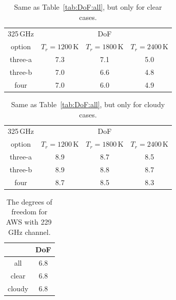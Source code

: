 \documentclass[12pt]{article}
\begin{document}
\begin{table}[!p]
	\centering
	\begin{tabular}[b]{c|c|c|c}
	325\,GHz & \multicolumn{3}{c}{DoF}   \\
	option &  $T_r = 1200 $\,K &   $T_r = 1800 $\,K &   $T_r = 2400$\,K \\
	\hline
		three-a &              7.3 &              7.1 &              5.0 \\		
		three-b &              7.0 &              6.6 &              4.8 \\		
		four    &              7.0 &              6.0 &              4.9 \\

	\hline
\end{tabular}
	\caption{Same as Table~\ref{tab:DoF:all}, but only for clear cases.}
\label{tab:DoF:clear}
\end{table}

\begin{table}[!p]
	\centering
	\begin{tabular}[b]{c|c|c|c}
	325\,GHz & \multicolumn{3}{c}{DoF}   \\
	option &  $T_r = 1200 $\,K &   $T_r = 1800 $\,K &   $T_r = 2400$\,K \\
		\hline
		three-a &              8.9 &              8.7 &              8.5 \\		
		three-b &              8.9 &              8.8 &              8.7 \\		
		four    &              8.7 &              8.5 &              8.3 \\

		\hline
	\end{tabular}
	\caption{Same as Table~\ref{tab:DoF:all}, but only for cloudy cases.  }
	\label{tab:DoF:cloudy}
\end{table}

\begin{table}[!p]
	\centering
	\begin{tabular}[b]{c|c}
		&   DoF \\
		\hline
		all    &      6.8        \\
		clear  &      6.8        \\
		cloudy &      6.8        \\
		\hline
	\end{tabular}
	\caption{The degrees of freedom for AWS with 229\,GHz channel. }
	\label{tab:DoF:4X}
\end{table}
\end{document}

